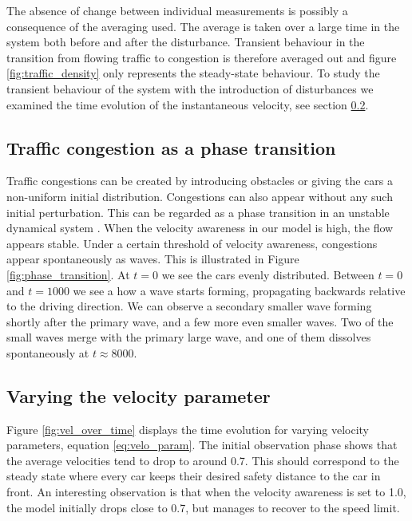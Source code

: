 \documentclass[11pt,a4paper,twocolumn]{article}
\begin{document}
 The absence of change between individual measurements is possibly a consequence of the averaging used. The average is taken over a large time in the system both before and after the disturbance. Transient behaviour in the transition from flowing traffic to congestion is therefore averaged out and figure \ref{fig:traffic_density} only represents the steady-state behaviour. To study the transient behaviour of the system with the introduction of disturbances we examined the time evolution of the instantaneous velocity, see section \ref{sec:vel_param}. 

\subsection{Traffic congestion as a phase transition} \label{sec:phase}
Traffic congestions can be created by introducing obstacles or giving the cars a non-uniform initial distribution. Congestions can also appear without any such initial perturbation. This can be regarded as a phase transition in an unstable dynamical system \cite{bando1995dynamical}. When the velocity awareness in our model is high, the flow appears stable. Under a certain threshold of velocity awareness, congestions appear spontaneously as waves. This is illustrated in Figure \ref{fig:phase_transition}. At $t=0$ we see the cars evenly distributed. Between $t=0$ and $t=1000$ we see a how a wave starts forming, propagating backwards relative to the driving direction. We can observe a secondary smaller wave forming shortly after the primary wave, and a few more even smaller waves. Two of the small waves merge with the primary large wave, and one of them dissolves spontaneously at $t \approx 8000$. 

\subsection{Varying the velocity parameter}\label{sec:vel_param}
Figure \ref{fig:vel_over_time} displays the time evolution for varying velocity parameters, equation \eqref{eq:velo_param}. The initial observation phase shows that the average velocities tend to drop to around 0.7.
This should correspond to the steady state where every car keeps their desired safety distance to the car in front.%
An interesting observation is that when the velocity awareness is set to 1.0, the model initially drops close to 0.7, but manages to recover to the speed limit. %
\end{document}
